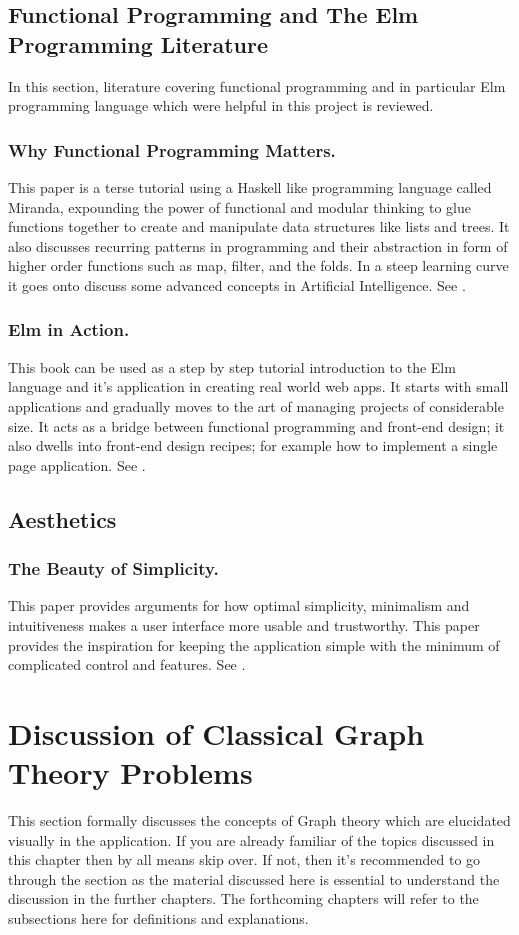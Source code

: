 \subsection{Functional Programming and The Elm Programming Literature}
In this section, literature covering functional programming and in particular
Elm programming language which were helpful in this project is reviewed.

\subsubsection{Why Functional Programming Matters.}
This paper is a terse tutorial using a Haskell like programming language called
Miranda, expounding the power of functional and modular thinking to glue
functions together to create and manipulate data structures like lists and
trees. It also discusses recurring patterns in programming and their
abstraction in form of higher order functions such as map, filter, and the
folds. In a steep learning curve it goes onto discuss some advanced concepts
in Artificial Intelligence. See \cite{Hughes89}.

\subsubsection{Elm in Action.}
This book can be used as a step by step tutorial introduction to the Elm
language and it's application in creating real world web apps. It starts with
small applications and gradually moves to the art of managing projects of
considerable size. It acts as a bridge between functional programming and
front-end design; it also dwells into front-end design recipes; for example how
to implement a single page application. See \cite{feldman2020elm}.

\subsection{Aesthetics}
\subsubsection{The Beauty of Simplicity.}
This paper provides arguments for how optimal simplicity, minimalism and
intuitiveness makes a user interface more usable and trustworthy. This paper provides
the inspiration for keeping the application simple with the minimum of complicated
control and features. See \cite{Karvonen2000}.

\section{Discussion of Classical Graph Theory Problems}
This section formally discusses the concepts of Graph theory which are
elucidated visually in the application. If you are already familiar of the
topics discussed in this chapter then by all means skip over.  If not, then
it's recommended to go through the section as the material discussed here is
essential to understand the discussion in the further chapters.  The
forthcoming chapters will refer to the subsections here for definitions and
explanations.


